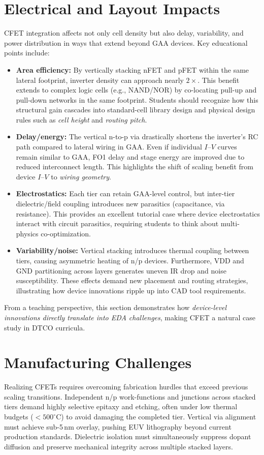\documentclass[conference]{IEEEtran}
\begin{document}
\section{Electrical and Layout Impacts}
CFET integration affects not only cell density but also delay,
variability, and power distribution in ways that extend beyond GAA devices.
Key educational points include:
\begin{itemize}
  \item \textbf{Area efficiency:} By vertically stacking nFET and pFET within the same lateral footprint, inverter density can approach
  nearly $2\times$. This benefit extends to complex logic cells (e.g., NAND/NOR) by co-locating pull-up and pull-down networks in
  the same footprint. Students should recognize how this structural gain cascades into standard-cell library design and physical design
  rules such as \emph{cell height} and \emph{routing pitch}.
  \item \textbf{Delay/energy:} The vertical n-to-p via drastically shortens the inverter’s RC path compared to lateral wiring in GAA.
  Even if individual $I$–$V$ curves remain similar to GAA, FO1 delay and stage energy are improved due to reduced interconnect length.
  This highlights the shift of scaling benefit from device $I$–$V$ to \emph{wiring geometry}.
  \item \textbf{Electrostatics:} Each tier can retain GAA-level control, but inter-tier dielectric/field coupling introduces new parasitics
  (capacitance, via resistance). This provides an excellent tutorial case where device electrostatics interact with circuit parasitics,
  requiring students to think about multi-physics co-optimization.
  \item \textbf{Variability/noise:} Vertical stacking introduces thermal coupling between tiers, causing asymmetric heating of n/p devices.
  Furthermore, VDD and GND partitioning across layers generates uneven IR drop and noise susceptibility. These effects demand new
  placement and routing strategies, illustrating how device innovations ripple up into CAD tool requirements.
\end{itemize}
From a teaching perspective, this section demonstrates how \emph{device-level innovations directly translate into EDA challenges},
making CFET a natural case study in DTCO curricula.

\section{Manufacturing Challenges}
Realizing CFETs requires overcoming fabrication hurdles that exceed previous scaling transitions.
Independent n/p work-functions and junctions across stacked tiers demand highly selective epitaxy and etching,
often under low thermal budgets ($<500^{\circ}$C) to avoid damaging the completed tier.
Vertical via alignment must achieve sub-5\,nm overlay, pushing EUV lithography beyond current production standards.
Dielectric isolation must simultaneously suppress dopant diffusion and preserve mechanical integrity across multiple stacked layers.
\end{document}
